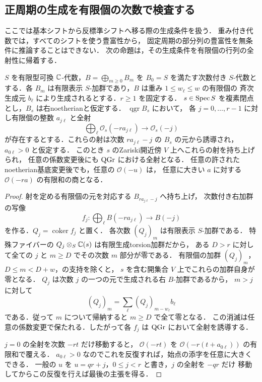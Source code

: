 \subsection{正周期の生成を有限個の次数で検査する}
\label{subsec:finite-periodic-generation}

ここでは基本シフトから反標準シフトへ移る際の生成条件を扱う．
重み付き代数では，すべてのシフトを使う豊富性から，
固定周期の部分列の豊富性を無条件に推論することはできない．
次の命題は，その生成条件を有限個の行列の全射性に帰着する．

\begin{proposition}[正周期の生成条件の開性]
\label{prop:finite-periodic-generation}
$S$ を有限型可換 $\mathbb C$-代数，$B=\bigoplus_{m\ge0}B_m$ を
$B_0=S$ を満たす次数付き $S$-代数とする．各 $B_m$ は有限表示
$S$-加群であり，$B$ は重み $1\le w_\ell\le w$ の有限個の
斉次生成元 $b_\ell$ により生成されるとする．$r\ge1$ を固定する．
$s\in\operatorname{Spec} S$ を複素閉点とし，$B_s$ は右noetherianと仮定する．
$\operatorname{qgr}B_s$ において，
各 $j=0,\ldots,r-1$ に対し有限個の整数 $a_{j\ell}$ と全射
\[
 \bigoplus_\ell\mathcal O_s(-r a_{j\ell})
 \longrightarrow\mathcal O_s(-j)
\]
が存在するとする．これらの射は次数 $r a_{j\ell}-j$ の
$B_s$ の元から誘導され，$a_{0\ell}>0$ と仮定する．
このとき $s$ のZariski開近傍 $V$ 上へこれらの射を持ち上げられ，
任意の係数変更後にも $\operatorname{QGr}$ における全射となる．
任意の許されたnoetherian基底変更後でも，任意の $\mathcal O(-u)$ は，
任意に大きい $a$ に対する $\mathcal O(-ra)$ の有限和の商となる．
\end{proposition}

\begin{proof}
射を定める有限個の元を対応する $B_{r a_{j\ell}-j}$ へ持ち上げ，
次数付き右加群の写像
\[
 f_j:\bigoplus_\ell B(-r a_{j\ell})\longrightarrow B(-j)
\]
を作る．$Q_j=\operatorname{coker} f_j$ と置く．
各次数 $(Q_j)_m$ は有限表示 $S$-加群である．
特殊ファイバーの $Q_j\otimes_S\mathbb C(s)$ は有限生成torsion加群だから，
ある $D>r$ に対して全ての $j$ と $m\ge D$ でその次数 $m$ 部分が零である．
有限個の加群 $(Q_j)_m$，$D\le m<D+w$，の支持を除くと，
$s$ を含む開集合 $V$ 上でこれらの加群自身が零となる．
$Q_j$ は次数 $j$ の一つの元で生成される右 $B$-加群であるから，
$m>j$ に対して
\[
 (Q_j)_m=\sum_\ell (Q_j)_{m-w_\ell}b_\ell
\]
である．従って $m$ について帰納すると $m\ge D$ で全て零となる．
この消滅は任意の係数変更で保たれる．したがって各 $f_j$ は
$\operatorname{QGr}$ において全射を誘導する．

$j=0$ の全射を次数 $-rt$ だけ移動すると，
$\mathcal O(-rt)$ を $\mathcal O(-r(t+a_{0\ell}))$ の有限和で覆える．
$a_{0\ell}>0$ なのでこれを反復すれば，始点の添字を任意に大きくできる．
一般の $u$ を $u=qr+j$，$0\le j<r$ と書き，$j$ の全射を $-qr$ だけ
移動してからこの反復を行えば最後の主張を得る．
\end{proof}

